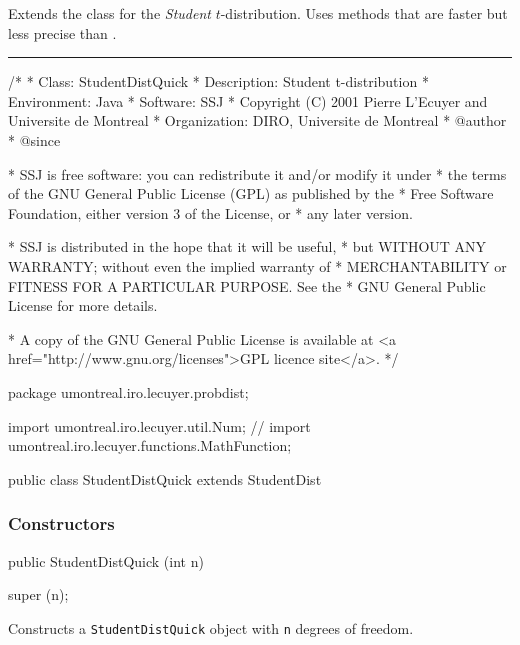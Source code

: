 
Extends the class  for
the \emph{Student} $t$-distribution. Uses methods that are faster but less precise
than .


\bigskip\hrule

\begin{code}
\begin{hide}
/*
 * Class:        StudentDistQuick
 * Description:  Student t-distribution
 * Environment:  Java
 * Software:     SSJ 
 * Copyright (C) 2001  Pierre L'Ecuyer and Universite de Montreal
 * Organization: DIRO, Universite de Montreal
 * @author       
 * @since

 * SSJ is free software: you can redistribute it and/or modify it under
 * the terms of the GNU General Public License (GPL) as published by the
 * Free Software Foundation, either version 3 of the License, or
 * any later version.

 * SSJ is distributed in the hope that it will be useful,
 * but WITHOUT ANY WARRANTY; without even the implied warranty of
 * MERCHANTABILITY or FITNESS FOR A PARTICULAR PURPOSE.  See the
 * GNU General Public License for more details.

 * A copy of the GNU General Public License is available at
   <a href="http://www.gnu.org/licenses">GPL licence site</a>.
 */
\end{hide}
package umontreal.iro.lecuyer.probdist;
\begin{hide}
import umontreal.iro.lecuyer.util.Num;
// import umontreal.iro.lecuyer.functions.MathFunction;
\end{hide}

public class StudentDistQuick extends StudentDist\begin{hide} {
    private static final int STUDENT_N1 = 20;
    private static final double STUDENT_X1 = 8.01;
    private static final int STUDENT_KMAX = 200;
    private static final double STUDENT_EPS = 0.5E-16;
\end{hide}\end{code}

\subsubsection* {Constructors}

\begin{code}

   public StudentDistQuick (int n)\begin{hide} {
      super (n);
   }\end{hide}
\end{code}
\begin{tabb} Constructs a \texttt{StudentDistQuick} object with \texttt{n} degrees of freedom.
\end{tabb}

